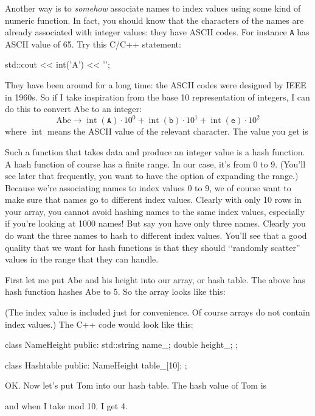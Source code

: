 Another way is to \textit{somehow} associate names to 
index values using some kind of numeric function.
In fact, you should know that the characters of the names
are already associated with integer values: they have ASCII codes.
For instance \verb!A! has ASCII value of 65.
Try this C/C++ statement:
\begin{console}
std::cout << int('A') << '\n';
\end{console}
They have been around for a long time: the ASCII codes were
designed by IEEE in 1960s.
So if I take inspiration from the base 10 representation of 
integers, 
I can do this to convert Abe to an integer:
\[
\text{Abe}
\rightarrow
\operatorname{int}(\texttt{A}) \cdot 10^0 +
\operatorname{int}(\texttt{b}) \cdot 10^1 +
\operatorname{int}(\texttt{e}) \cdot 10^2
\]
where $\operatorname{int}$ means the ASCII value of the relevant character.
The value you get is


Such a function that takes data and produce an integer value 
is a hash function.
A hash function of course has a finite range.
In our case, it's from 0 to 9.
(You'll see later that frequently, you want to have the option of 
expanding the range.)
Because we're associating names to index values 0 to 9, we of course
want to make sure that names go to different index values.
Clearly with only 10 rows in your array, you cannot avoid 
hashing names to the same index values, especially if you're looking at 1000 names!
But say you have only three names.
Clearly you do want the three names to hash to different index values.
You'll see that a good quality that we want for hash functions
is that they should \lq\lq randomly scatter'' values in the range that they 
can handle. 

First let me put Abe and his height into our array, or hash table.
The above has hash function hashes Abe to 5.
So the array looks like this:



(The index value is included just for convenience. Of course arrays do not contain index values.)
The C++ code would look like this:
{\small
\begin{console}
class NameHeight
{
public:
    std::string name_;
    double height_;
};

class Hashtable
{
public:
    NameHeight table_[10];
};
\end{console}
}

OK. 
Now let's put Tom into our hash table.
The hash value of Tom is

and when I take mod 10, I get 4.

